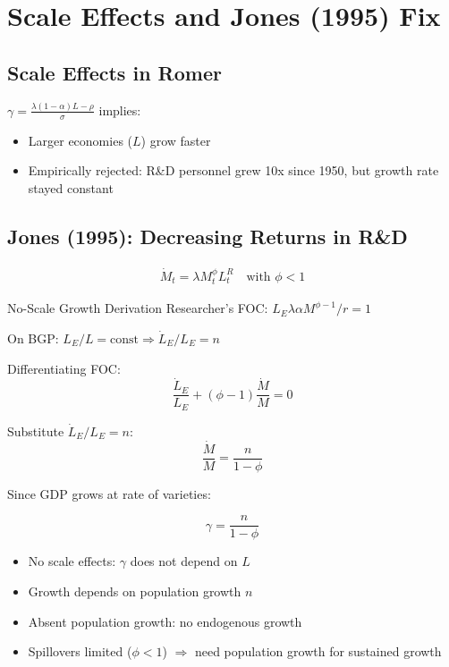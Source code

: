 \documentclass[a4paper,11pt]{article}
\begin{document}
\clearpage

\section{Scale Effects and Jones (1995) Fix}

\subsection*{Scale Effects in Romer}
\begin{tcolorbox}[colback=yellow!10,colframe=yellow!60,title=Problem]
$\gamma = \frac{\lambda(1-\alpha)L - \rho}{\sigma}$ implies:
\begin{itemize}
    \item Larger economies ($L$) grow faster
    \item Empirically rejected: R\&D personnel grew 10x since 1950, but growth rate stayed constant
\end{itemize}
\end{tcolorbox}

\subsection*{Jones (1995): Decreasing Returns in R\&D}
\begin{align*}
\dot{M}_t = \lambda M_t^\phi L_t^R \quad \text{with } \phi < 1
\tag{Jones R\&D}
\end{align*}

\begin{derivationbox}{No-Scale Growth Derivation}
Researcher's FOC: $L_E \lambda \alpha M^{\phi-1} / r = 1$

On BGP: $L_E / L = \text{const} \Rightarrow \dot{L}_E / L_E = n$

Differentiating FOC:
\[
\frac{\dot{L}_E}{L_E} + (\phi - 1)\frac{\dot{M}}{M} = 0
\]

Substitute $\dot{L}_E / L_E = n$:
\[
\frac{\dot{M}}{M} = \frac{n}{1 - \phi}
\]

Since GDP grows at rate of varieties:
\end{derivationbox}

\begin{resultbox}
\[
\boxed{\gamma = \frac{n}{1-\phi}}
\tag{Jones Growth}
\]
\end{resultbox}

\medskip
\begin{tcolorbox}[colback=green!5,colframe=green3,title=Key Insight]
\begin{itemize}
    \item No scale effects: $\gamma$ does not depend on $L$
    \item Growth depends on population growth $n$
    \item Absent population growth: no endogenous growth
    \item Spillovers limited ($\phi < 1$) $\Rightarrow$ need population growth for sustained growth
\end{itemize}
\end{tcolorbox}
\end{document}
